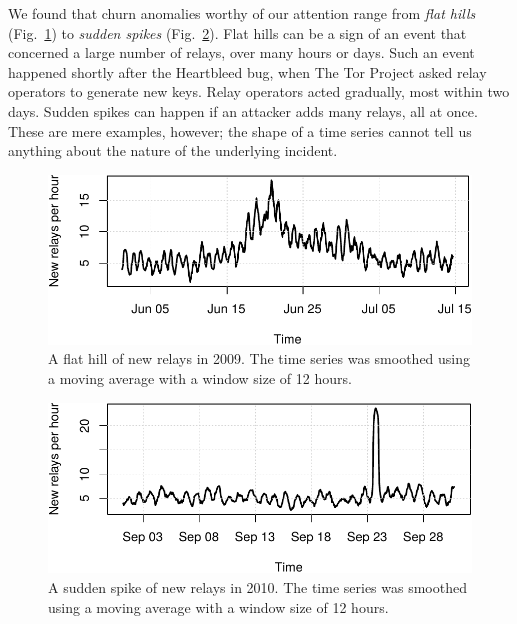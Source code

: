 We found that churn anomalies worthy of our attention range from \emph{flat
hills} (Fig.~\ref{fig:flat-hill}) to \emph{sudden spikes}
(Fig.~\ref{fig:sudden-spike}).  Flat hills can be a sign of an event that
concerned a large number of relays, over many hours or days.  Such an event
happened shortly after the Heartbleed bug, when The Tor Project asked relay
operators to generate new keys.  Relay operators acted gradually, most within
two days.  Sudden spikes can happen if an attacker adds many relays, all at
once.  These are mere examples, however; the shape of a time series cannot tell
us anything about the nature of the underlying incident.

\begin{figure}[t]
	\centering
	\includegraphics[width=\linewidth]{diagrams/flat-hill.pdf}
	\caption{A flat hill of new relays in 2009.  The time series was smoothed
	using a moving average with a window size of 12 hours.}
	\label{fig:flat-hill}
\end{figure}

\begin{figure}[t]
	\centering
	\includegraphics[width=\linewidth]{diagrams/sudden-spike.pdf}
	\caption{A sudden spike of new relays in 2010.  The time series was smoothed
	using a moving average with a window size of 12 hours.}
	\label{fig:sudden-spike}
\end{figure}

